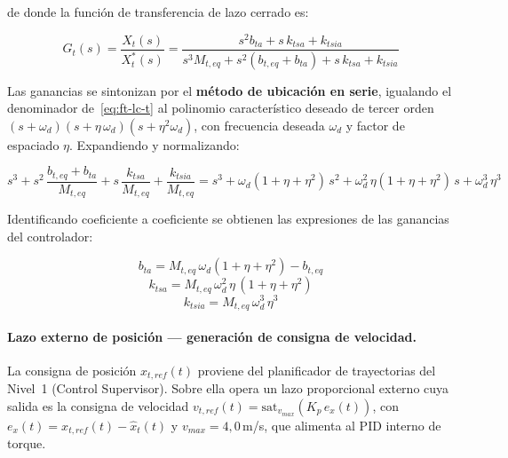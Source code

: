 \documentclass[12pt, a4paper]{article}
\begin{document}
de donde la función de transferencia de lazo cerrado es:

\begin{equation}
    \label{eq:ft-lc-t}
    G_t(s) = \frac{X_t(s)}{X_t^*(s)}
    = \frac{s^2 b_{ta} + s\,k_{tsa} + k_{tsia}}
           {s^3 M_{t,eq} + s^2(b_{t,eq}+b_{ta}) + s\,k_{tsa} + k_{tsia}}
\end{equation}

Las ganancias se sintonizan por el \textbf{método de ubicación en serie}, igualando el
denominador de~\eqref{eq:ft-lc-t} al polinomio característico deseado de tercer orden
$(s+\omega_d)(s+\eta\,\omega_d)(s+\eta^2\omega_d)$, con frecuencia deseada $\omega_d$
y factor de espaciado $\eta$. Expandiendo y normalizando:

\begin{equation}
    \label{eq:pol-des-t}
    s^3 + s^2\,\frac{b_{t,eq}+b_{ta}}{M_{t,eq}}
        + s\,\frac{k_{tsa}}{M_{t,eq}}
        + \frac{k_{tsia}}{M_{t,eq}}
    = s^3 + \omega_d(1+\eta+\eta^2)\,s^2
           + \omega_d^2\,\eta(1+\eta+\eta^2)\,s
           + \omega_d^3\,\eta^3
\end{equation}

Identificando coeficiente a coeficiente se obtienen las expresiones de las ganancias
del controlador:

\begin{equation}
    \label{eq:ganancias-t}
    b_{ta}    = M_{t,eq}\,\omega_d(1+\eta+\eta^2) - b_{t,eq}
\end{equation}
\begin{equation}
    k_{tsa}   = M_{t,eq}\,\omega_d^2\,\eta\,(1+\eta+\eta^2)
\end{equation}
\begin{equation}
    k_{tsia}  = M_{t,eq}\,\omega_d^3\,\eta^3
\end{equation}

\paragraph{Lazo externo de posición — generación de consigna de velocidad.}

La consigna de posición $x_{t,ref}(t)$ proviene del planificador de trayectorias del
Nivel~1 (Control Supervisor). Sobre ella opera un lazo proporcional externo cuya salida
es la consigna de velocidad $v_{t,ref}(t) = \mathrm{sat}_{v_{max}}(K_p\,e_x(t))$,
con $e_x(t) = x_{t,ref}(t) - \hat{x}_t(t)$ y $v_{max} = 4{,}0$\,m/s, que alimenta
al PID interno de torque.
\end{document}
